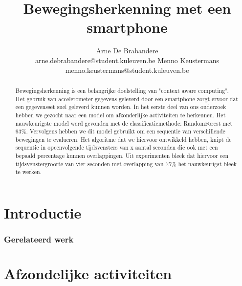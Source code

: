 \documentclass{article}
\title{Bewegingsherkenning met een smartphone}
\author{Arne De Brabandere\\
	arne.debrabandere@student.kuleuven.be
    \And
    Menno Keustermans\\
    menno.keustermans@student.kuleuven.be}
\begin{document}
\maketitle

\begin{abstract}

Bewegingsherkenning is een belangrijke doelstelling van "context aware computing". Het gebruik van accelerometer gegevens geleverd door een smartphone zorgt ervoor dat een gegevensset snel geleverd kunnen worden. In het eerste deel van ons onderzoek hebben we gezocht naar een model om afzonderlijke activiteiten te herkennen. Het nauwkeurigste model werd gevonden met de classificatiemethode: RandomForest met 93\%. Vervolgens hebben we dit model gebruikt om een sequentie van verschillende bewegingen te evalueren. Het algoritme dat we hiervoor ontwikkeld hebben, knipt de sequentie in opeenvolgende tijdsvensters van x aantal seconden die ook met een bepaald percentage kunnen overlappingen. Uit experimenten bleek dat hiervoor een tijdsvenstergrootte van vier seconden met overlapping van 75\% het nauwkeurigst bleek te werken.

\end{abstract}

\section{Introductie}


\subsubsection{Gerelateerd werk}




\section{Afzondelijke activiteiten}
\end{document}
